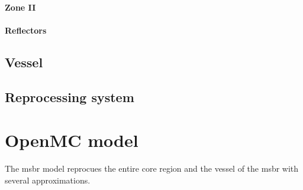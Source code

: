 \paragraph{Zone II}


\paragraph{Reflectors}

\subsection{Vessel}
\label{sub:msbr-vessel}

\subsection{Reprocessing system}
\label{sub:msbr-reprocessing-system}

\section{OpenMC model}
\label{sec:openmc_model}

The \OpenMC \Gls{msbr} model reprocues the entire core region and the vessel
of the \Gls{msbr} with several approximations.

